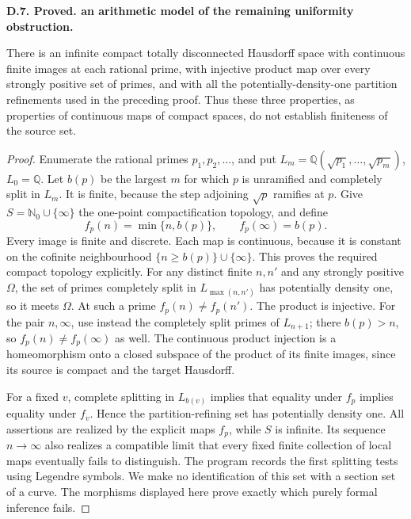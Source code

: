 \documentclass[11pt,oneside]{article}
\makeatletter
\newcounter{statementanchor}
\newenvironment{statement}[3]{%
 \refstepcounter{statementanchor}\def\@currentlabel{#1}%
 \par\addvspace{9pt}\noindent
 \textbf{#1. #2. #3.}\par\nobreak\noindent\ignorespaces
}{\par\addvspace{5pt}}
\makeatother
\begin{document}
\begin{statement}{D.7}{Proved}{an arithmetic model of the remaining uniformity obstruction}
\label{st:D.7}
\label{D-density-model}
There is an infinite compact totally disconnected
Hausdorff space with continuous finite images at
each rational prime, with injective product
map over every strongly positive set of primes,
and with all the potentially-density-one
partition refinements used in the preceding
proof. Thus these three properties, as
properties of continuous maps of compact spaces, do not establish
finiteness of the source set.
\end{statement}
\begin{proof}
Enumerate the rational primes $p_1,p_2,\ldots$,
and put $L_m=\mathbb Q(\sqrt{p_1},\ldots,\sqrt{p_m})$,
$L_0=\mathbb Q$. Let $b(p)$ be the largest
$m$ for which $p$ is unramified and completely
split in $L_m$. It is finite, because the
step adjoining $\sqrt p$ ramifies at $p$.
Give $S=\mathbb N_0\cup\{\infty\}$ the one-point
compactification topology, and define
\[
 f_p(n)=\min\{n,b(p)\},\qquad f_p(\infty)=b(p).
\]
Every image is finite and discrete. Each map is
continuous, because it is constant on the cofinite
neighbourhood $\{n\ge b(p)\}\cup\{\infty\}$.
This proves the required compact topology explicitly.
For any distinct finite $n,n'$
and any strongly positive $\Omega$, the set
of primes completely split in
$L_{\max(n,n')}$ has potentially density one,
so it meets $\Omega$. At such a prime
$f_p(n)\ne f_p(n')$. The product is injective.
For the pair $n,\infty$, use instead the completely
split primes of $L_{n+1}$; there $b(p)>n$, so
$f_p(n)\ne f_p(\infty)$ as well. The continuous
product injection is a homeomorphism onto a closed
subspace of the product of its finite images,
since its source is compact and the target Hausdorff.

For a fixed $v$, complete splitting in
$L_{b(v)}$ implies that equality under $f_p$
implies equality under $f_v$. Hence the
partition-refining set has potentially
density one. All assertions are realized
by the explicit maps $f_p$, while
$S$ is infinite. Its sequence $n\to\infty$
also realizes a compatible limit that every fixed
finite collection of local maps eventually fails
to distinguish. The program
records the first splitting tests using
Legendre symbols. We make no identification
of this set with a section set of a curve.
The morphisms displayed here prove exactly
which purely formal inference fails.
\end{proof}
\end{document}
